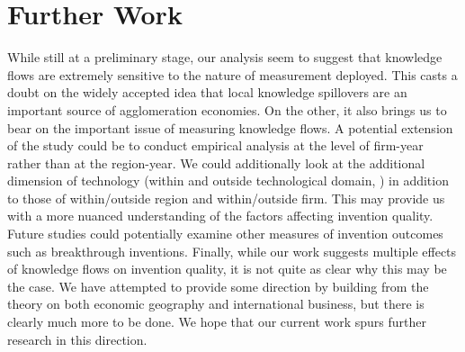 \documentclass[12pt,letterpaper]{article}
\begin{document}
\section*{Further Work}
While still at a preliminary stage, our analysis seem to suggest that knowledge flows are extremely sensitive to the nature of measurement deployed. This casts a doubt on the widely accepted idea that local knowledge spillovers are an important source of agglomeration economies. On the other, it also brings us to bear on the important issue of measuring knowledge flows. A potential extension of the study could be to conduct empirical analysis at the level of firm-year rather than at the region-year. We could additionally look at the additional dimension of technology (within and outside technological domain, \cite{Rosenkopf2001}) in addition to those of within/outside region and within/outside firm. This may provide us with a more nuanced understanding of the factors affecting invention quality. Future studies could potentially examine other measures of invention outcomes such as breakthrough inventions. Finally, while our work suggests multiple effects of knowledge flows on invention quality, it is not quite as clear why this may be the case. We have attempted to provide some direction by building from the theory on both economic geography and international business, but there is clearly much more to be done. We hope that our current work spurs further research in this direction.  

\renewcommand{\refname}{REFERENCES}
\singlespacing
 

\newpage
\normalsize
\doublespacing

\appendix
\end{document}
